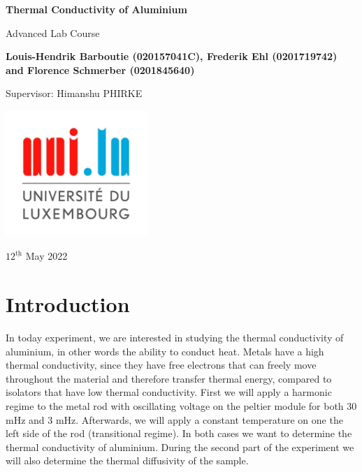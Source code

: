 \documentclass{scrartcl}
\begin{document}
\begin{titlepage}
    \begin{center}
        \vspace*{1cm}
        \Huge
        \textbf{Thermal Conductivity of Aluminium}
        
        \vspace{0.5cm}
        \LARGE
        
        
        \vspace{0.5cm}
        \LARGE
        Advanced Lab Course
        
        \vspace{1.5cm}
        \textbf{Louis-Hendrik Barboutie (020157041C), Frederik Ehl (0201719742) and Florence Schmerber (0201845640)}
        
        \vspace{1cm}
        Supervisor: Himanshu PHIRKE
        \vfill
        

        \includegraphics[width=0.4\textwidth]{logo_uni.jpg}
        
        \Large
        $12^{\underline{\text{th}}}$ May 2022
    \end{center}
\end{titlepage}



\section{Introduction}
In today experiment, we are interested in studying the thermal conductivity of aluminium, in other words the ability to conduct heat. Metals have a high thermal conductivity, since they have free electrons that can freely move throughout the material and therefore transfer thermal energy, compared to isolators that have low thermal conductivity. First we will apply a harmonic regime to the metal rod with oscillating voltage on the peltier module for both 30 mHz and 3 mHz. Afterwards, we will apply a constant temperature on one the left side of the rod (transitional regime). In both cases we want to determine the thermal conductivity of aluminium. During the second part of the experiment we will also determine the thermal diffusivity of the sample.
\end{document}
